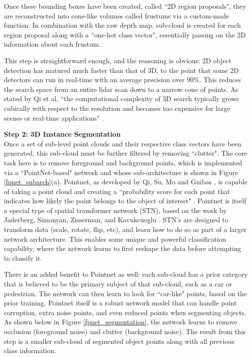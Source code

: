 Once these bounding boxes have been created, called ``2D region proposals", they are reconstructed into cone-like volumes called frustums via a custom-made function. In combination with the raw depth map, sub-cloud is created for each region proposal along with a ``one-hot class vector", essentially passing on the 2D information about each frustum. 

This step is straightforward enough, and the reasoning is obvious: 2D object detection has matured much faster than that of 3D, to the point that some 2D detectors can run in real-time with an average precision over 90\%. This reduces the search space from an entire lidar scan down to a narrow cone of points. As stated by Qi et al, ``the computational complexity of 3D search typically grows cubically with respect to the resolution and becomes too expensive for large scenes or real-time applications" \cite{qi_frustum_2017}.


\textbf{{\large Step 2: 3D Instance Segmentation}} \\
Once a set of sub-level point clouds and their respective class vectors have been generated, this sub-cloud must be further filtered by removing ``clutter". The core task here is to remove foreground and background points, which is implemented via a ``PointNet-based" network and whose sub-architecture is shown in Figure \ref{fpnet_subarch}(a). Pointnet, as developed by Qi, Su, Mo and Guibas \cite{qi_pointnet:_2017}, is capable of taking a point cloud and creating a ``probability score for each point that indicates how likely the point belongs to the object of interest" \cite{qi_frustum_2017}. Pointnet is itself a special type of spatial transformer network (STN), based on the work by Jaderberg, Simonyan, Zisserman, and Kavukcuoglu \cite{jaderberg_spatial_2015}. STN's are designed to transform data (scale, rotate, flip, etc), and learn how to do so as part of a larger network architecture. This enables some unique and powerful classification capability, where the network learns to first reshape the data before attempting to classify it. 

There is an added benefit to Pointnet as well: each sub-cloud has a prior category that is believed to be the primary subject of that sub-cloud, such as a car or pedestrian. The network can then learn to look for ``car-like" points, based on the prior training. Pointnet itself is a robust network model that can handle point corruption, extra noise points, and even reduced points when segmenting objects. As shown below in Figure \ref{fpnet_segmentation}, the network learns to remove occlusion (foreground noise) and clutter (background noise). The result from this step is a smaller sub-cloud of segmented object points along with all previous class information. 

